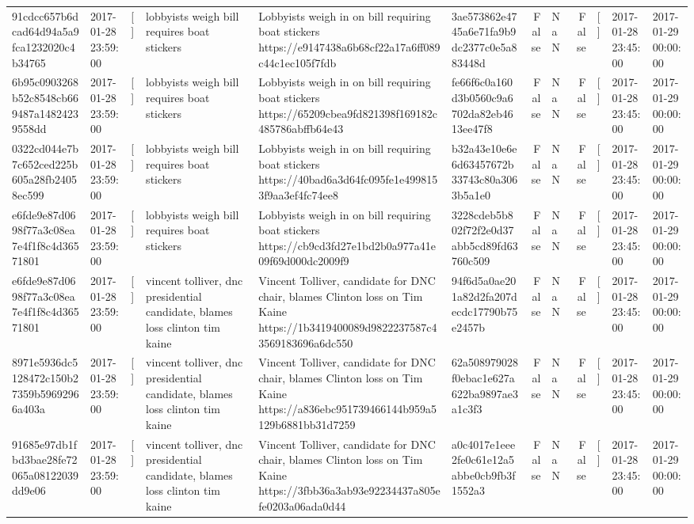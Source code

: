 \begin{tabular}{llllllrlrlll}
91cdcc657b6dcad64d94a5a9fca1232020c4b34765 & 2017-01-28 23:59:00 & [] & lobbyists weigh bill requires boat stickers & Lobbyists weigh in on bill requiring boat stickers https://e9147438a6b68cf22a17a6ff089c44c1ec105f7fdb & 3ae573862e4745a6e71fa9b9dc2377c0e5a883448d & False & NaN & False & [] & 2017-01-28 23:45:00 & 2017-01-29 00:00:00 \\
6b95c0903268b52c8548cb669487a14824239558dd & 2017-01-28 23:59:00 & [] & lobbyists weigh bill requires boat stickers & Lobbyists weigh in on bill requiring boat stickers https://65209cbea9fd821398f169182c485786abffb64e43 & fe66f6c0a160d3b0560c9a6702da82eb4613ee47f8 & False & NaN & False & [] & 2017-01-28 23:45:00 & 2017-01-29 00:00:00 \\
0322cd044e7b7c652ced225b605a28fb24058ec599 & 2017-01-28 23:59:00 & [] & lobbyists weigh bill requires boat stickers & Lobbyists weigh in on bill requiring boat stickers https://40bad6a3d64fc095fe1e4998153f9aa3ef4fc74ee8 & b32a43e10e6e6d63457672b33743c80a3063b5a1e0 & False & NaN & False & [] & 2017-01-28 23:45:00 & 2017-01-29 00:00:00 \\
e6fde9e87d0698f77a3c08ea7e4f1f8c4d36571801 & 2017-01-28 23:59:00 & [] & lobbyists weigh bill requires boat stickers & Lobbyists weigh in on bill requiring boat stickers https://cb9cd3fd27e1bd2b0a977a41e09f69d000dc2009f9 & 3228cdeb5b802f72f2e0d37abb5cd89fd63760c509 & False & NaN & False & [] & 2017-01-28 23:45:00 & 2017-01-29 00:00:00 \\
e6fde9e87d0698f77a3c08ea7e4f1f8c4d36571801 & 2017-01-28 23:59:00 & [] & vincent tolliver, dnc presidential candidate, blames loss clinton tim kaine & Vincent Tolliver, candidate for DNC chair, blames Clinton loss on Tim Kaine https://1b3419400089d9822237587c43569183696a6dc550 & 94f6d5a0ae201a82d2fa207decdc17790b75e2457b & False & NaN & False & [] & 2017-01-28 23:45:00 & 2017-01-29 00:00:00 \\
8971e5936dc5128472c150b27359b59692966a403a & 2017-01-28 23:59:00 & [] & vincent tolliver, dnc presidential candidate, blames loss clinton tim kaine & Vincent Tolliver, candidate for DNC chair, blames Clinton loss on Tim Kaine https://a836ebc951739466144b959a5129b6881bb31d7259 & 62a508979028f0ebac1e627a622ba9897ae3a1c3f3 & False & NaN & False & [] & 2017-01-28 23:45:00 & 2017-01-29 00:00:00 \\
91685e97db1fbd3bae28fe72065a08122039dd9e06 & 2017-01-28 23:59:00 & [] & vincent tolliver, dnc presidential candidate, blames loss clinton tim kaine & Vincent Tolliver, candidate for DNC chair, blames Clinton loss on Tim Kaine https://3fbb36a3ab93e92234437a805efe0203a06ada0d44 & a0c4017e1eee2fe0c61e12a5abbe0cb9fb3f1552a3 & False & NaN & False & [] & 2017-01-28 23:45:00 & 2017-01-29 00:00:00 \\

\end{tabular}
